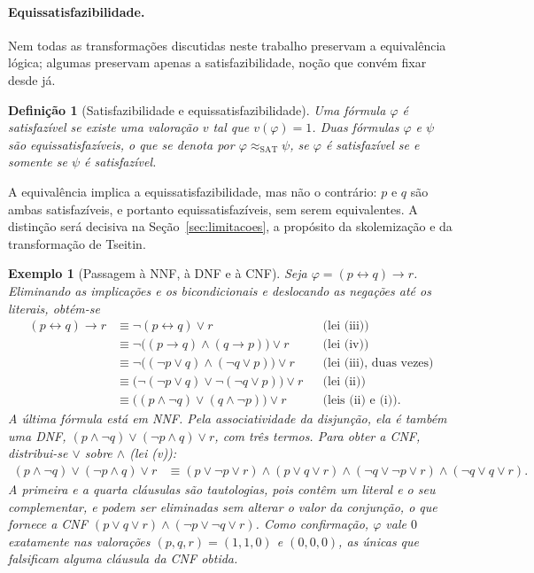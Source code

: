 \documentclass[12pt,a4paper,oneside]{report}
\theoremstyle{tituloplain}
\theoremstyle{titulodef}
\newtheorem{definicao}[teorema]{Definição}
\newtheorem{exemplo}[teorema]{Exemplo}
\begin{document}
\paragraph{Equissatisfazibilidade.} Nem todas as transformações discutidas neste trabalho preservam a equivalência lógica; algumas preservam apenas a satisfazibilidade, noção que convém fixar desde já.

\begin{definicao}[Satisfazibilidade e equissatisfazibilidade]\label{def:equissat}
Uma fórmula $\varphi$ é \emph{satisfazível} se existe uma valoração $v$ tal que $v(\varphi)=1$. Duas fórmulas $\varphi$ e $\psi$ são \emph{equissatisfazíveis}, o que se denota por $\varphi\approx_{\mathrm{SAT}}\psi$, se $\varphi$ é satisfazível se e somente se $\psi$ é satisfazível.
\end{definicao}

A equivalência implica a equissatisfazibilidade, mas não o contrário: $p$ e $q$ são ambas satisfazíveis, e portanto equissatisfazíveis, sem serem equivalentes. A distinção será decisiva na Seção~\ref{sec:limitacoes}, a propósito da skolemização e da transformação de Tseitin.

\begin{exemplo}[Passagem à NNF, à DNF e à CNF]\label{ex:conversao}
Seja $\varphi=(p\leftrightarrow q)\rightarrow r$. Eliminando as implicações e os bicondicionais e deslocando as negações até os literais, obtém-se
\begin{align*}
(p\leftrightarrow q)\rightarrow r
&\equiv\neg(p\leftrightarrow q)\vee r &&\text{(lei (iii))}\\
&\equiv\neg\bigl((p\rightarrow q)\wedge(q\rightarrow p)\bigr)\vee r &&\text{(lei (iv))}\\
&\equiv\neg\bigl((\neg p\vee q)\wedge(\neg q\vee p)\bigr)\vee r &&\text{(lei (iii), duas vezes)}\\
&\equiv\bigl(\neg(\neg p\vee q)\vee\neg(\neg q\vee p)\bigr)\vee r &&\text{(lei (ii))}\\
&\equiv\bigl((p\wedge\neg q)\vee(q\wedge\neg p)\bigr)\vee r &&\text{(leis (ii) e (i))}.
\end{align*}
A última fórmula está em NNF. Pela associatividade da disjunção, ela é também uma DNF, $(p\wedge\neg q)\vee(\neg p\wedge q)\vee r$, com três termos. Para obter a CNF, distribui-se $\vee$ sobre $\wedge$ (lei (v)):
\begin{align*}
(p\wedge\neg q)\vee(\neg p\wedge q)\vee r
&\equiv(p\vee\neg p\vee r)\wedge(p\vee q\vee r)\wedge(\neg q\vee\neg p\vee r)\wedge(\neg q\vee q\vee r).
\end{align*}
A primeira e a quarta cláusulas são tautologias, pois contêm um literal e o seu complementar, e podem ser eliminadas sem alterar o valor da conjunção, o que fornece a CNF $(p\vee q\vee r)\wedge(\neg p\vee\neg q\vee r)$. Como confirmação, $\varphi$ vale $0$ exatamente nas valorações $(p,q,r)=(1,1,0)$ e $(0,0,0)$, as únicas que falsificam alguma cláusula da CNF obtida.
\end{exemplo}
\end{document}
